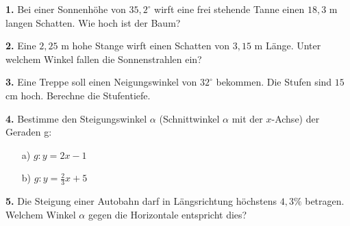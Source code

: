 \documentclass{article}
\begin{document}
\setcounter{section}{1}\setcounter{subsection}{0}

\textbf{1.} Bei einer Sonnenhöhe von $35,2^\circ$ wirft eine frei stehende Tanne einen $18,3$ m langen Schatten. Wie hoch ist der Baum?

\textbf{2.} Eine $2,25$ m hohe Stange wirft einen Schatten von $3,15$ m L\"ange. Unter welchem Winkel fallen die Sonnenstrahlen ein?

\textbf{3.} Eine Treppe soll einen Neigungswinkel von $32^\circ$ bekommen. Die Stufen sind $15$ cm hoch. Berechne die Stufentiefe.

\textbf{4.} Bestimme den Steigungswinkel $\alpha$ (Schnittwinkel $\alpha$ mit der $x$-Achse) der Geraden g:
\begin{itemize}
\item[a)] $g: y = 2x-1$
\item[b)] $g: y = \frac{2}{3} x + 5$
\end{itemize}

\textbf{5.} Die Steigung einer Autobahn darf in L\"angsrichtung h\"ochstens $4,3\%$ betragen. Welchem Winkel $\alpha$ gegen die Horizontale entspricht dies?
\end{document}
